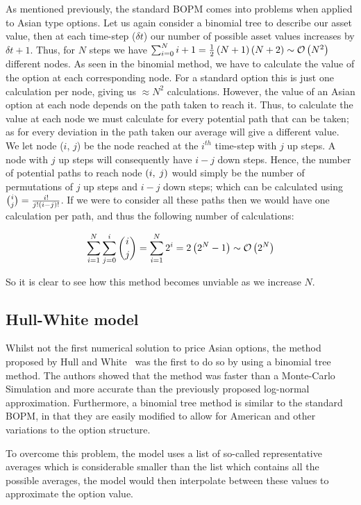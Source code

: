 As mentioned previously, the standard BOPM comes into problems when applied to Asian type options. Let us again consider a binomial tree to describe our asset value, then at each time-step (\(\delta t\)) our number of possible asset values increases by \(\delta t + 1\). Thus, for \(N \) steps we have \(\sum_{i=0}^N i + 1 = \frac{1}{2}\left(N+1\right)\left(N+2\right) \sim \mathcal{O}\left(N^2\right)\) different nodes. As seen in the binomial method, we have to calculate the value of the option at each corresponding node. For a standard option this is just one calculation per node, giving us \(\approx N^2\) calculations. However, the value of an Asian option at each node depends on the path taken to reach it. Thus, to calculate the value at each node we must calculate for every potential path that can be taken; as for every deviation in the path taken our average will give a different value. We let node (\(i \),\; \(j\)) be the node reached at the \(i^{th}\) time-step with \(j \) up steps. A node with \(j\) up steps will consequently have \(i-j\) down steps. Hence, the number of potential paths to reach node \(\left(i,\; j\right)\) would simply be the number of permutations of \(j \) up steps and \(i-j\) down steps; which can be calculated using \( {i\choose j} = \frac{i!}{j!\left(i-j\right)!}\). If we were to consider all these paths then we would have one calculation per path, and thus the following number of calculations:

\begin{equation*}
    \sum_{i=1}^N\sum_{j=0}^i {i \choose j} = \sum_{i=1}^N 2^i = 2\left(2^N -1\right) \sim \mathcal{O}\left(2^N\right)
\end{equation*}

So it is clear to see how this method becomes unviable as we increase \(N \).

\subsection{Hull-White model}

Whilst not the first numerical solution to price Asian options, the method proposed by Hull and White~\cite{Hull21} was the first to do so by using a binomial tree method. The authors showed that the method was faster than a Monte-Carlo Simulation and more accurate than the previously proposed log-normal approximation. Furthermore, a binomial tree method is similar to the standard BOPM, in that they are easily modified to allow for American and other variations to the option structure.

To overcome this problem, the model uses a list of so-called representative averages which is considerable smaller than the list which contains all the possible averages, the model would then interpolate between these values to approximate the option value. 

